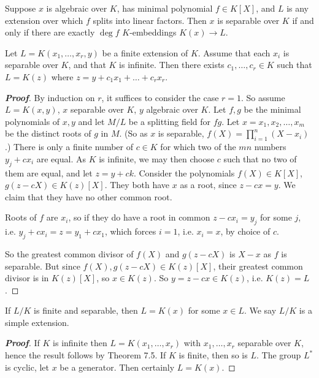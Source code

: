 \begin{proposition}
Suppose $x$ is algebraic over $K$, has minimal polynomial $f \in K[X]$, and $L$ is any extension over which $f$ splits into linear factors. Then $x$ is separable over $K$ if and only if there are exactly $\deg f$ $K$-embeddings $K(x) \to L$.
\end{proposition}

\begin{theorem}
Let $L = K(x_1, \dots , x_r, y)$ be a finite extension of $K$. Assume that each $x_i$ is separable over $K$, and that $K$ is infinite. Then there exists $c_1, \dots , c_r \in K$ such that $L = K(z)$ where $z = y + c_1x_1 + \dots+ c_rx_r$.
\end{theorem}

\begin{proof}[\bf Proof]
By induction on $r$, it suffices to consider the case $r = 1$. So assume $L = K(x, y)$, $x$ separable over $K$, $y$ algebraic over $K$. Let $f, g$ be the minimal polynomials of $x, y$ and let $M/L$ be a splitting field for $fg$. Let $x = x_1, x_2, \dots , x_m$ be the distinct roots of $g$ in $M$. (So as $x$ is separable, $f(X) = \prod^n_{i=1}(X - x_i)$.) There is only a finite number of $c \in K$ for which two of the $mn$ numbers $y_j + cx_i$ are equal. As $K$ is infinite, we may then choose $c$ such that no two of them are equal, and let $z = y + ck$. Consider the polynomials $f(X) \in K[X]$, $g(z - cX) \in K(z)[X]$. They both have $x$ as a root, since $z - cx = y$. We claim that they have no other common root.

Roots of $f$ are $x_i$, so if they do have a root in common $z - cx_i = y_j$ for some $j$, i.e. $y_j + cx_i = z = y_1 + cx_1$, which forces $i = 1$, i.e. $x_i = x$, by choice of $c$.

So the greatest common divisor of $f(X)$ and $g(z - cX)$ is $X - x$ as $f$ is separable. But since $f(X), g(z - cX) \in K(z)[X]$, their greatest common divisor is in $K(z)[X]$, so $x \in K(z)$. So $y = z - cx \in K(z)$, i.e. $K(z) = L$.
\end{proof}

\begin{corollary}
If $L/K$ is finite and separable, then $L = K(x)$ for some $x \in L$. We say $L/K$ is a simple extension.
\end{corollary}

\begin{proof}[\bf Proof]
If $K$ is infinite then $L = K(x_1, \dots , x_r)$ with $x_1, \dots , x_r$ separable over $K$, hence the result follows by Theorem 7.5. If $K$ is finite, then so is $L$. The group $L^*$ is cyclic, let $x$ be a generator. Then certainly $L = K(x)$.
\end{proof}


